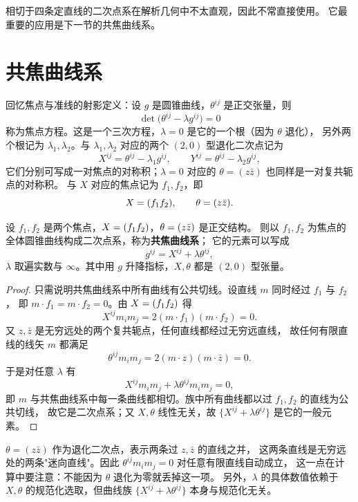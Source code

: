 相切于四条定直线的二次点系在解析几何中不太直观，因此不常直接使用。
它最重要的应用是下一节的共焦曲线系。

\section{共焦曲线系}

回忆焦点与准线的射影定义：设 $g$ 是圆锥曲线，$\theta^{ij}$ 是正交张量，则
\[
\det\bigl(\theta^{ij}-\lambda g^{ij}\bigr)=0
\]
称为焦点方程。这是一个三次方程，$\lambda=0$ 是它的一个根（因为 $\theta$ 退化），
另外两个根记为 $\lambda_1,\lambda_2$。与 $\lambda_1,\lambda_2$ 对应的两个 $(2,0)$ 型退化二次点记为
\[
X^{ij}=\theta^{ij}-\lambda_1 g^{ij},\qquad Y^{ij}=\theta^{ij}-\lambda_2 g^{ij},
\]
它们分别可写成一对焦点的对称积；$\lambda=0$ 对应的 $\theta=(z\bar z)$ 也同样是一对复共轭点的对称积。
与 $X$ 对应的焦点记为 $f_1,f_2$，即
\[
X=(f_1f_2),\qquad \theta=(z\bar z).
\]

\begin{proposition}[共焦曲线系]\label{prop:confocal}
设 $f_1,f_2$ 是两个焦点，$X=(f_1f_2)$，$\theta=(z\bar z)$ 是正交结构。
则以 $f_1,f_2$ 为焦点的全体圆锥曲线构成二次点系，称为\textbf{共焦曲线系}；
它的元素可以写成
\[
g^{ij}=X^{ij}+\lambda\theta^{ij},
\]
$\lambda$ 取遍实数与 $\infty$。其中用 $g$ 升降指标，$X,\theta$ 都是 $(2,0)$ 型张量。
\end{proposition}

\begin{proof}
只需说明共焦曲线系中所有曲线有公共切线。设直线 $m$ 同时经过 $f_1$ 与 $f_2$，
即 $m\cdot f_1=m\cdot f_2=0$。由 $X=(f_1f_2)$ 得
\[
X^{ij}m_im_j=2(m\cdot f_1)(m\cdot f_2)=0 .
\]
又 $z,\bar z$ 是无穷远处的两个复共轭点，任何直线都经过无穷远直线，
故任何有限直线的线矢 $m$ 都满足
\[
\theta^{ij}m_im_j=2(m\cdot z)(m\cdot\bar z)=0 .
\]
于是对任意 $\lambda$ 有
\[
X^{ij}m_im_j+\lambda\theta^{ij}m_im_j=0 ,
\]
即 $m$ 与共焦曲线系中每一条曲线都相切。族中所有曲线都以过 $f_1,f_2$ 的直线为公共切线，
故它是二次点系；又 $X,\theta$ 线性无关，故 $\{X^{ij}+\lambda\theta^{ij}\}$ 是它的一般元素。
\end{proof}

\begin{remark}
$\theta=(z\bar z)$ 作为退化二次点，表示两条过 $z,\bar z$ 的直线之并，
这两条直线是无穷远处的两条"迷向直线"。因此 $\theta^{ij}m_im_j=0$ 对任意有限直线自动成立，
这一点在计算中要注意：不能因为 $\theta$ 退化为零就丢掉这一项。
另外，$\lambda$ 的具体数值依赖于 $X,\theta$ 的规范化选取，但曲线族
$\{X^{ij}+\lambda\theta^{ij}\}$ 本身与规范化无关。
\end{remark}

